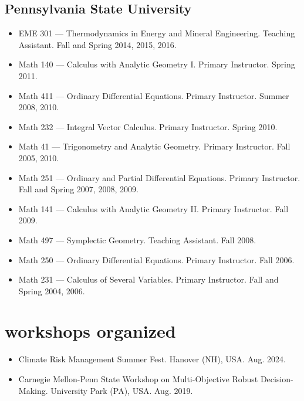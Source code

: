 \documentclass[11pt,article,oneside]{memoir}
\begin{document}
\subsection{Pennsylvania State University}
\begin{itemize}[label={}]

\item EME 301 --- Thermodynamics in Energy and Mineral Engineering. Teaching Assistant. Fall and Spring 2014, 2015, 2016.

\item Math 140 --- Calculus with Analytic Geometry I. Primary Instructor. Spring 2011.

\item Math 411 --- Ordinary Differential Equations. Primary Instructor. Summer 2008, 2010.

\item Math 232 --- Integral Vector Calculus. Primary Instructor. Spring 2010.

\item Math 41 --- Trigonometry and Analytic Geometry. Primary Instructor. Fall 2005, 2010.

\item Math 251 --- Ordinary and Partial Differential Equations. Primary Instructor. Fall and Spring 2007, 2008, 2009.

\item Math 141 --- Calculus with Analytic Geometry II. Primary Instructor. Fall 2009.

\item Math 497 --- Symplectic Geometry. Teaching Assistant. Fall 2008.

\item Math 250 --- Ordinary Differential Equations. Primary Instructor. Fall 2006.

\item Math 231 --- Calculus of Several Variables. Primary Instructor. Fall and Spring 2004, 2006.

\end{itemize}



\section{workshops organized}

\mbox{}\vspace{-\dimexpr\baselineskip\relax}

\begin{itemize}[label={}]

\item Climate Risk Management Summer Fest. Hanover (NH), USA. Aug. 2024.

\item Carnegie Mellon-Penn State Workshop on Multi-Objective Robust Decision-Making. University Park (PA), USA. Aug. 2019.

\end{itemize}
\end{document}
